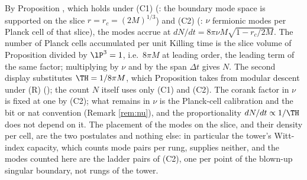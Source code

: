 By Proposition , which holds under (C1) (: the boundary mode space is supported on the slice $r = r_c = (2M)^{1/3}$) and (C2) (: $\nu$ fermionic modes per Planck cell of that slice), the modes accrue at $dN/dt = 8\pi\nu M\sqrt{1 - r_c/2M}$. The number of Planck cells accumulated per unit Killing time is the slice volume of Proposition  divided by $\lP^3 = 1$, i.e.\ $8\pi M$ at leading order, the leading term of the same factor; multiplying by $\nu$ and by the span $\Delta t$ gives $N$. The second display substitutes $\TH = 1/8\pi M$, which Proposition  takes from modular descent under (R) (); the count $N$ itself uses only (C1) and (C2). The corank factor in $\nu$ is fixed at one by (C2); what remains in $\nu$ is the Planck-cell calibration and the bit or nat convention (Remark \ref{rem:nu}), and the proportionality $dN/dt \propto 1/\TH$ does not depend on it. The placement of the modes on the slice, and their density per cell, are the two postulates and nothing else: in particular the tower's Witt-index capacity, which counts mode pairs per rung, supplies neither, and the modes counted here are the ladder pairs of (C2), one per point of the blown-up singular boundary, not rungs of the tower.

